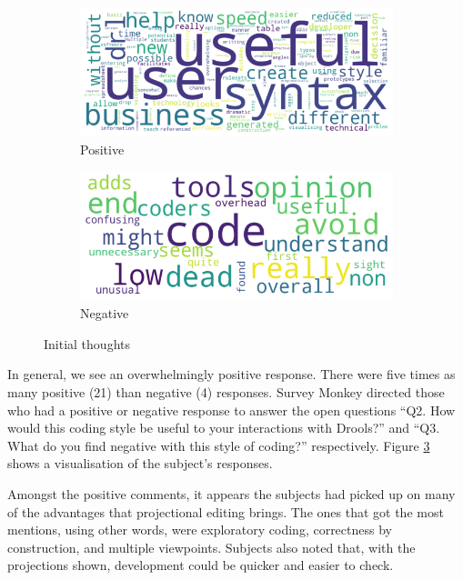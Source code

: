 \begin{figure}
    \begin{subfigure}{.60\textwidth}
      \centering
      \includegraphics[width=.95\linewidth]{Sections/images/positive_wordcloud.png}
      \caption{Positive}
      \label{fig:wfig1}
    \end{subfigure}%
    \begin{subfigure}{.40\textwidth}
      \centering
      \includegraphics[width=.95\linewidth]{Sections/images/negative_wordcloud.png}
      \caption{Negative}
      \label{fig:wfig2}
    \end{subfigure}
    \caption{Initial thoughts}
    \label{fig:wordclouds}
\end{figure}

In general, we see an overwhelmingly positive response.
There were five times as many positive (21) than negative (4) responses.
Survey Monkey directed those who had a positive or negative response to answer the open questions ``Q2. How would this coding style be useful to your interactions with Drools?'' and ``Q3. What do you find negative with this style of coding?'' respectively.
Figure \ref{fig:wordclouds} shows a visualisation of the subject's responses.

Amongst the positive comments, it appears the subjects had picked up on many of the advantages that projectional editing brings.
The ones that got the most mentions, using other words, were exploratory coding, correctness by construction, and multiple viewpoints.
Subjects also noted that, with the projections shown, development could be quicker and easier to check.

